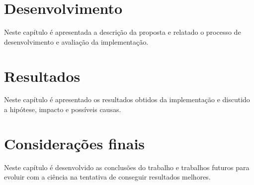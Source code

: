 \documentclass[
	12pt,				%
	openright,			%
	twoside,			%
	a4paper,			%
	english,			%
	french,				%
	spanish,			%
	brazil				%
	]{abntex2}
\begin{document}


% 





% 









\chapter{Desenvolvimento}

Neste capítulo é apresentada a descrição da proposta e relatado o processo de
desenvolvimento e avaliação da implementação.





\chapter{Resultados}

Neste capítulo é apresentado os resultados obtidos da implementação e discutido a hipótese, impacto e possíveis causas.





\chapter{Considerações finais}

Neste capítulo é desenvolvido as conclusões do trabalho e trabalhos futuros para evoluir com a ciência na tentativa de conseguir resultados melhores.





% 

\end{document}
